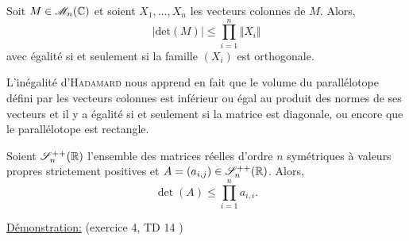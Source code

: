
\begin{prop}
    Soit $M \in \mathscr{M}_n(\mathbb{C})$ et soient $X_1, \dots, X_n$ les vecteurs colonnes de $M$. Alors,
    $$|\mathrm{det}(M)| \leqslant \prod_{i=1}^{n} \Vert X_i \Vert$$
    avec égalité si et seulement si la famille $(X_i)$ est orthogonale.
\end{prop}

%    

\begin{preuve}

\end{preuve}

L'inégalité d'\textsc{Hadamard} nous apprend en fait que le volume du parallélotope défini par les vecteurs colonnes est inférieur ou égal au produit des normes de ses vecteurs et il y a égalité si et seulement si la matrice est diagonale, ou encore que le parallélotope est rectangle. 


\begin{prop}
    Soient $\mathscr{S}_n ^{++} (\mathbb{R})$ l'ensemble des matrices réelles d'ordre $n$ symétriques à valeurs propres strictement positives et $A = (a_{i,j}) \in \mathscr{S}_n ^{++} (\mathbb{R})$. Alors,
    $$\det(A) \leqslant \prod_{i=1}^{n} a_{i,i}.$$
\end{prop}

\underline{Démonstration:} (exercice 4, TD 14 \cite{acamanes})


